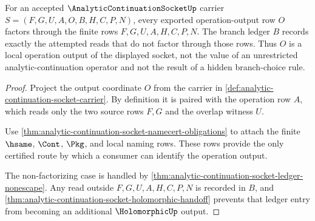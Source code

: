 \begin{theorem}
\label{thm:analytic-continuation-socket-operation-output-factorization}
For an accepted $\AnalyticContinuationSocketUp$ carrier $S=(F,G,U,A,O,B,H,C,P,N)$, every exported operation-output row $O$ factors through the finite rows $F,G,U,A,H,C,P,N$. The branch ledger $B$ records exactly the attempted reads that do not factor through those rows. Thus $O$ is a local operation output of the displayed socket, not the value of an unrestricted analytic-continuation operator and not the result of a hidden branch-choice rule.
\end{theorem}
\begin{proof}
Project the output coordinate $O$ from the carrier in \autoref{def:analytic-continuation-socket-carrier}. By definition it is paired with the operation row $A$, which reads only the two source rows $F,G$ and the overlap witness $U$.

Use \autoref{thm:analytic-continuation-socket-namecert-obligations} to attach the finite $\hsame$, $\Cont$, $\Pkg$, and local naming rows. These rows provide the only certified route by which a consumer can identify the operation output.

The non-factorizing case is handled by \autoref{thm:analytic-continuation-socket-ledger-nonescape}. Any read outside $F,G,U,A,H,C,P,N$ is recorded in $B$, and \autoref{thm:analytic-continuation-socket-holomorphic-handoff} prevents that ledger entry from becoming an additional $\HolomorphicUp$ output.
\end{proof}

